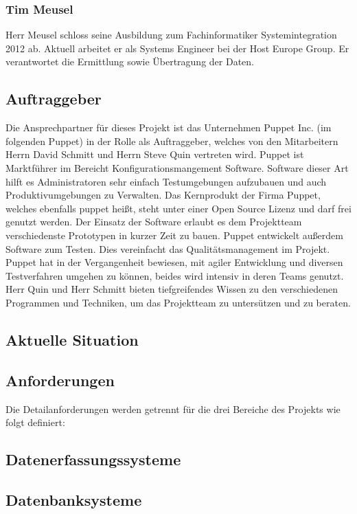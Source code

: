 \subsubsection{Tim Meusel}
Herr Meusel schloss seine Ausbildung zum Fachinformatiker Systemintegration
2012 ab. Aktuell arbeitet er als Systems Engineer bei der Host Europe
Group. Er verantwortet die Ermittlung sowie Übertragung der Daten.

\subsection{Auftraggeber}
Die Ansprechpartner für dieses Projekt ist das Unternehmen Puppet Inc. (im
folgenden Puppet) in der Rolle als Auftraggeber, welches von den Mitarbeitern
Herrn David Schmitt und Herrn Steve Quin vertreten wird. Puppet ist Marktführer
im Bereicht Konfigurationsmangement Software. Software dieser Art hilft es
Administratoren sehr einfach Testumgebungen aufzubauen und auch
Produktivumgebungen zu Verwalten. Das Kernprodukt der Firma Puppet, welches
ebenfalls puppet heißt, steht unter einer Open Source Lizenz und darf frei
genutzt werden. Der Einsatz der Software erlaubt es dem Projektteam
verschiedenste Prototypen in kurzer Zeit zu bauen. Puppet entwickelt außerdem
Software zum Testen. Dies vereinfacht das Qualitätsmanagement im Projekt.
Puppet hat in der Vergangenheit bewiesen, mit agiler Entwicklung und diversen
Testverfahren umgehen zu können, beides wird intensiv in deren Teams genutzt.
Herr Quin und Herr Schmitt bieten tiefgreifendes Wissen zu den verschiedenen
Programmen und Techniken, um das Projektteam zu untersützen und zu beraten.

\subsection{Aktuelle Situation}

\subsection{Anforderungen}
Die Detailanforderungen werden getrennt für die drei Bereiche des Projekts wie
folgt definiert:
\subsection{Datenerfassungssysteme}

\subsection{Datenbanksysteme}

